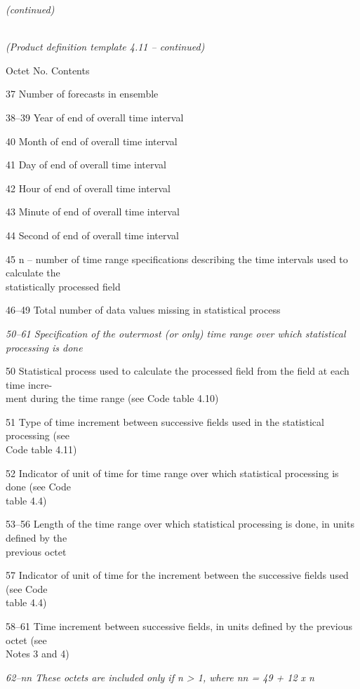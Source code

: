 \emph{(continued)}

\emph{\\
(Product definition template 4.11 -- continued)}

Octet No. Contents

37 Number of forecasts in ensemble

38--39 Year of end of overall time interval

40 Month of end of overall time interval

41 Day of end of overall time interval

42 Hour of end of overall time interval

43 Minute of end of overall time interval

44 Second of end of overall time interval

45 n -- number of time range specifications describing the time intervals used to calculate the\\
statistically processed field

46--49 Total number of data values missing in statistical process

\emph{50--61 Specification of the outermost (or only) time range over which statistical}\\
\emph{processing is done}

50 Statistical process used to calculate the processed field from the field at each time incre-\\
ment during the time range (see Code table 4.10)

51 Type of time increment between successive fields used in the statistical processing (see\\
Code table 4.11)

52 Indicator of unit of time for time range over which statistical processing is done (see Code\\
table 4.4)

53--56 Length of the time range over which statistical processing is done, in units defined by the\\
previous octet

57 Indicator of unit of time for the increment between the successive fields used (see Code\\
table 4.4)

58--61 Time increment between successive fields, in units defined by the previous octet (see\\
Notes 3 and 4)

\emph{62--nn These octets are included only if n \textgreater{} 1, where nn = 49 + 12 x n}

